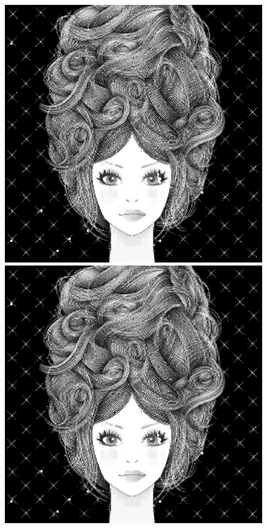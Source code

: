 \documentclass[11pt,a4paper,appendixprefix=true,numbers=noenddot]{scrreprt}
\begin{document}
\begin{figure}[!ht]
\includegraphics[scale=0.35]{images/girl07}
\includegraphics[scale=0.35]{images/girl08}

\end{figure}
\end{document}
